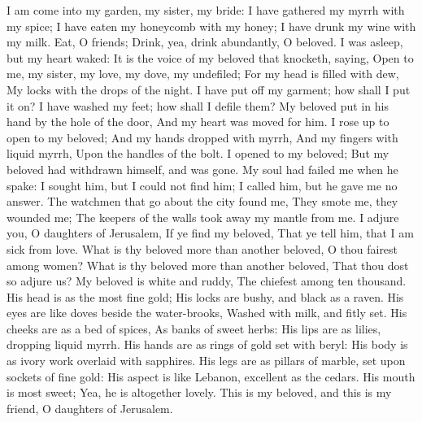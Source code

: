 I am come into my garden, my sister, my bride: I have gathered my myrrh with my spice; I have eaten my honeycomb with my honey; I have drunk my wine with my milk. Eat, O friends; Drink, yea, drink abundantly, O beloved.  I was asleep, but my heart waked: It is the voice of my beloved that knocketh, saying, Open to me, my sister, my love, my dove, my undefiled; For my head is filled with dew, My locks with the drops of the night.  I have put off my garment; how shall I put it on? I have washed my feet; how shall I defile them?  My beloved put in his hand by the hole of the door, And my heart was moved for him.  I rose up to open to my beloved; And my hands dropped with myrrh, And my fingers with liquid myrrh, Upon the handles of the bolt.  I opened to my beloved; But my beloved had withdrawn himself, and was gone. My soul had failed me when he spake: I sought him, but I could not find him; I called him, but he gave me no answer.  The watchmen that go about the city found me, They smote me, they wounded me; The keepers of the walls took away my mantle from me.  I adjure you, O daughters of Jerusalem, If ye find my beloved, That ye tell him, that I am sick from love.  What is thy beloved more than another beloved, O thou fairest among women? What is thy beloved more than another beloved, That thou dost so adjure us?  My beloved is white and ruddy, The chiefest among ten thousand.  His head is as the most fine gold; His locks are bushy, and black as a raven.  His eyes are like doves beside the water-brooks, Washed with milk, and fitly set.  His cheeks are as a bed of spices, As banks of sweet herbs: His lips are as lilies, dropping liquid myrrh.  His hands are as rings of gold set with beryl: His body is as ivory work overlaid with sapphires.  His legs are as pillars of marble, set upon sockets of fine gold: His aspect is like Lebanon, excellent as the cedars.  His mouth is most sweet; Yea, he is altogether lovely. This is my beloved, and this is my friend, O daughters of Jerusalem. 

